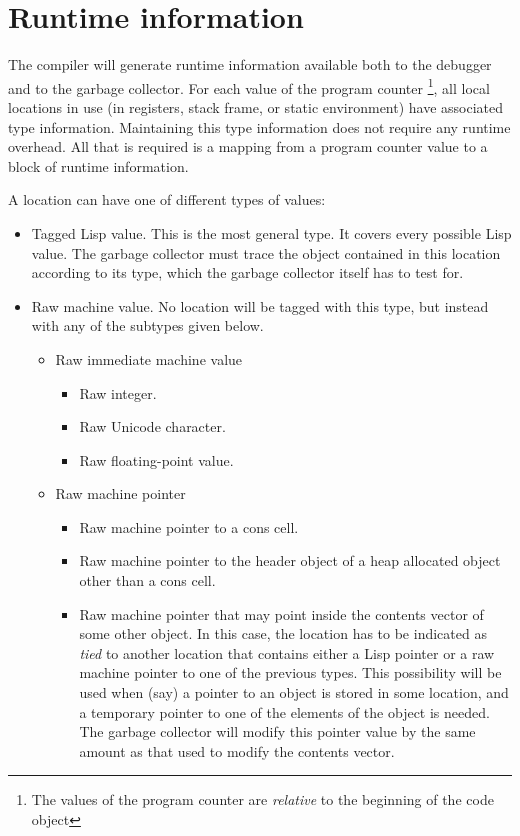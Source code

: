 \section{Runtime information}

The compiler will generate runtime information available both to the
debugger and to the garbage collector.  For each value of the program
counter%
\footnote{The values of the program counter are \emph{relative} to the
  beginning of the code object}, all local locations in use (in
registers, stack frame, or static environment) have associated type
information.  Maintaining this type information does not require any
runtime overhead.  All that is required is a mapping from a program
counter value to a block of runtime information.

A location can have one of different types of values:

\begin{itemize}
\item Tagged Lisp value.  This is the most general type.  It covers
  every possible Lisp value.  The garbage collector must trace the
  object contained in this location according to its type, which the
  garbage collector itself has to test for. 
\item Raw machine value.  No location will be tagged with this type,
  but instead with any of the subtypes given below.
  \begin{itemize}
  \item Raw immediate machine value
    \begin{itemize}
      \item Raw integer.
      \item Raw Unicode character.
      \item Raw floating-point value.
    \end{itemize}
  \item Raw machine pointer
    \begin{itemize}
    \item Raw machine pointer to a cons cell.  
    \item Raw machine pointer to the header object of a heap allocated
      object other than a cons cell.
    \item Raw machine pointer that may point inside the contents
      vector of some other object. In this case, the location has to
      be indicated as \emph{tied} to another location that contains
      either a Lisp pointer or a raw machine pointer to one of the
      previous types.  This possibility will be used when (say) a
      pointer to an object is stored in some location, and a temporary
      pointer to one of the elements of the object is needed.  The
      garbage collector will modify this pointer value by the same
      amount as that used to modify the contents vector. 
    \end{itemize}
  \end{itemize}
\end{itemize}

